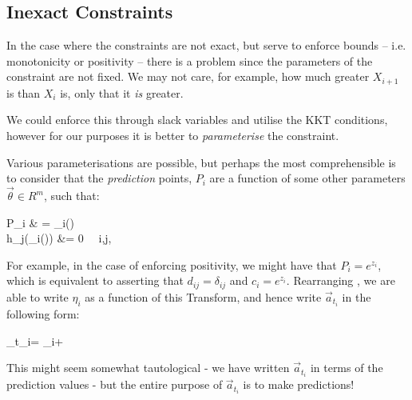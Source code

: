 \documentclass[]{article}
\newcommand\T[1][i]{\mathcal{T}_{#1}}
\def\ai{\vec{a}_{t_i}}
\def\vi{\vec{v}_i}
\def\wi{\vec{w}}
\begin{document}
		\subsection{Inexact Constraints}

			In the case where the constraints are not exact, but serve to enforce bounds -- i.e. monotonicity or positivity -- there is a problem since the parameters of the constraint are not fixed. We may not care, for example, how much greater $X_{i+1}$ is than $X_i$ is, only that it \textit{is} greater. 

			We could enforce this through slack variables and utilise the KKT conditions, however for our purposes it is better to \textit{parameterise} the constraint. 

			Various parameterisations are possible, but perhaps the most comprehensible is to consider that the \textit{prediction} points, $P_i$ are a function of some other parameters $\vec{\theta} \in R^m$, such that:
			\begin{spalign}
				P_i & = \T(\vec{\theta})
				\\
				h_j(\T(\vec{\theta})) &= 0 ~\forall~i,j, \vec{\theta}
			\end{spalign}
			For example, in the case of enforcing positivity, we might have that $P_i = e^{z_i}$, which is equivalent to asserting that $d_{ij} = \delta_{ij}$ and $c_i = e^{z_i}$. Rearranging , we are able to write $\eta_i$ as a function of this Transform, and hence write $\ai$ in the following form:
			\begin{spalign}
				\ai = \vi +  \wi \label{E:Reparam}
			\end{spalign}
			This might seem somewhat tautological - we have written $\ai$ in terms of the prediction values - but the entire purpose of $\ai$ is to make predictions!
\end{document}
